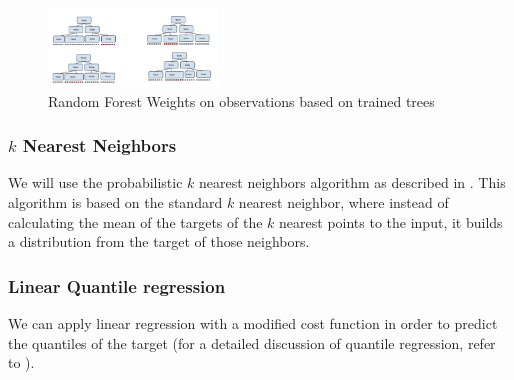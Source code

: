 \documentclass[a4paper,twocolumn,5p]{elsarticle}
\begin{document}
\begin{figure}
  \centering
  \includegraphics[width=0.4\textwidth]{quantile_random_forest}
  \caption{Random Forest Weights on observations based on trained trees}
  \label{figure:qrandom}
\end{figure}

\subsubsection{$k$ Nearest Neighbors}

We will use the probabilistic $k$ nearest neighbors algorithm as described in  
\cite{quantileknnmangalova}. 
This algorithm is based on the standard $k$ nearest neighbor, 
where instead of calculating the mean of 
the targets of the
$k$ nearest points to the input, it builds a distribution 
from the target of those neighbors.

\subsubsection{Linear Quantile regression}

We can apply linear regression with a modified cost function in order to 
predict the quantiles of the target (for a detailed discussion of 
quantile regression, refer to \cite{koenker_quantile_2001}). 
\end{document}
